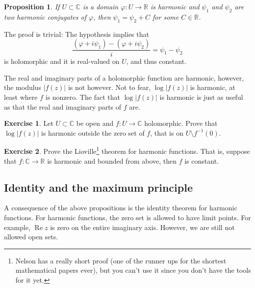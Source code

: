\documentclass[12pt,openany]{book}
\renewcommand{\Re}{\operatorname{Re}}
\newcommand{\sabs}[1]{\lvert {#1} \rvert}
\newcommand{\C}{{\mathbb{C}}}
\newcommand{\R}{{\mathbb{R}}}
\theoremstyle{plain}
\newtheorem{prop}[thm]{Proposition}
\theoremstyle{remark}
\theoremstyle{definition}
\newenvironment{exbox}{%
    \def\FrameCommand{\vrule width 1pt \relax\hspace {10pt}}%
    \MakeFramed {\advance \hsize -\width \FrameRestore }%
}{%
    \endMakeFramed
}
\theoremstyle{exercise}
\newtheorem{exercise}{Exercise}[section]
\theoremstyle{example}
\begin{document}
\begin{prop}
If $U \subset \C$ is a domain $\varphi \colon U \to \R$ is harmonic
and $\psi_1$ and $\psi_2$ are two harmonic conjugates of $\varphi$,
then $\psi_1 = \psi_2 + C$ for some $C \in \R$.
\end{prop}

The proof is trivial: The hypothesis implies that
\begin{equation*}
\frac{(\varphi + i \psi_1) - (\varphi + i \psi_2)}{i} =  \psi_1-\psi_2
\end{equation*}
is holomorphic and it is real-valued on $U$, and thus constant.

The real and imaginary parts of a holomorphic function are harmonic,
however, the modulus $\sabs{f(z)}$ is not however.  Not to fear,
$\log \sabs{f(z)}$ is harmonic, at least where $f$ is nonzero.
The fact that $\log \sabs{f(z)}$ is harmonic is just as useful
as that the real and imaginary parts of $f$ are.

\begin{savenotes}
\begin{exbox}
\begin{exercise}
Let $U \subset \C$ be open and
$f \colon U \to \C$ holomorphic.  Prove that $\log \sabs{f(z)}$ is harmonic
outside the zero set of $f$, that is on $U \setminus f^{-1}(0)$.
\end{exercise}

\begin{exercise}
Prove the Lioville\footnote{%
Nelson has a really short proof (one of the runner ups for the shortest
mathematical papers ever), but you can't use it since you don't have the
tools for it yet.} theorem for
harmonic functions.  That is, suppose that $f \colon \C \to \R$ is harmonic
and bounded from above, then $f$ is constant.
\end{exercise}
\end{exbox}
\end{savenotes}



\subsection{Identity and the maximum principle}

A consequence of the above propositions is the identity theorem
for harmonic functions.  For harmonic functions, the zero set is allowed to
have limit points. For example, $\Re z$ is zero on the entire imaginary
axis.  However, we are still not allowed open sets.
\end{document}
